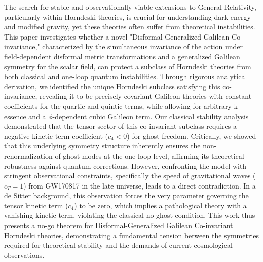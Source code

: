 \documentclass[twocolumn]{aastex631}
\begin{document}
The search for stable and observationally viable extensions to General Relativity, particularly within Horndeski theories, is crucial for understanding dark energy and modified gravity, yet these theories often suffer from theoretical instabilities. This paper investigates whether a novel "Disformal-Generalized Galilean Co-invariance," characterized by the simultaneous invariance of the action under field-dependent disformal metric transformations and a generalized Galilean symmetry for the scalar field, can protect a subclass of Horndeski theories from both classical and one-loop quantum instabilities. Through rigorous analytical derivation, we identified the unique Horndeski subclass satisfying this co-invariance, revealing it to be precisely covariant Galileon theories with constant coefficients for the quartic and quintic terms, while allowing for arbitrary k-essence and a $\phi$-dependent cubic Galileon term. Our classical stability analysis demonstrated that the tensor sector of this co-invariant subclass requires a negative kinetic term coefficient ($c_4 < 0$) for ghost-freedom. Critically, we showed that this underlying symmetry structure inherently ensures the non-renormalization of ghost modes at the one-loop level, affirming its theoretical robustness against quantum corrections. However, confronting the model with stringent observational constraints, specifically the speed of gravitational waves ($c_T=1$) from GW170817 in the late universe, leads to a direct contradiction. In a de Sitter background, this observation forces the very parameter governing the tensor kinetic term ($c_4$) to be zero, which implies a pathological theory with a vanishing kinetic term, violating the classical no-ghost condition. This work thus presents a no-go theorem for Disformal-Generalized Galilean Co-invariant Horndeski theories, demonstrating a fundamental tension between the symmetries required for theoretical stability and the demands of current cosmological observations.
\end{document}
